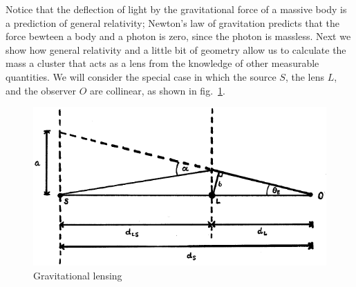 Notice that the deflection of light by the gravitational force of a massive body is a prediction of general relativity; Newton's law of gravitation predicts that the force bewteen a body and a photon is zero, since the photon is massless. Next we show how general relativity and a little bit of geometry allow us to calculate the mass a cluster that acts as a lens from the knowledge of other measurable quantities. We will consider the special case in which the source $S$, the lens $L$, and the observer $O$ are collinear, as shown in fig.\ \ref{fig:lec10_8}.
\begin{figure}[ht]
\begin{center}
\includegraphics[scale=0.6]{Draw/lec10_8.png}
\end{center}
\caption{Gravitational lensing}
\label{fig:lec10_8}
\end{figure}

